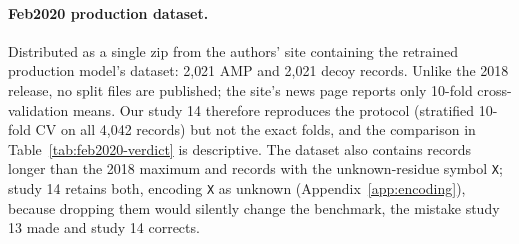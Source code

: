 \paragraph{Feb2020 production dataset.} Distributed as a single zip from
the authors' site containing the retrained production model's dataset:
2{,}021 AMP and 2{,}021 decoy records. Unlike the 2018 release, no split
files are published; the site's news page reports only 10-fold
cross-validation means. Our study 14 therefore reproduces the protocol
(stratified 10-fold CV on all 4{,}042 records) but not the exact folds,
and the comparison in Table~\ref{tab:feb2020-verdict} is descriptive.
The dataset also contains records longer than the 2018 maximum and
records with the unknown-residue symbol \texttt{X}; study 14 retains both,
encoding \texttt{X} as unknown (Appendix~\ref{app:encoding}), because
dropping them would silently change the benchmark, the mistake study 13
made and study 14 corrects.
